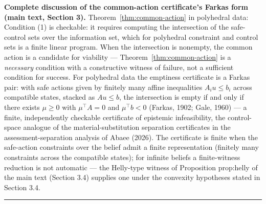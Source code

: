 \documentclass[11pt]{article}
\theoremstyle{definition}
\begin{document}
\bigskip
\noindent\textbf{Complete discussion of the common-action certificate's Farkas form (main text, Section 3).}
Theorem~\ref{thm:common-action} in polyhedral data:
Condition (1) is checkable: it requires computing the intersection of
the safe-control sets over the information set, which for polyhedral
constraint and control sets is a finite linear program. When the
intersection is nonempty, the common action is a candidate for viability
--- Theorem~\ref{thm:common-action} is a \emph{necessary} condition with a constructive
witness of failure, not a sufficient condition for success. For
polyhedral data the emptiness certificate is a Farkas pair: with safe
actions given by finitely many affine inequalities \(A_i u \le b_i\)
across compatible states, stacked as \(A u \le b\), the intersection is
empty if and only if there exists \(\mu \ge 0\) with \(\mu^{\top} A = 0\) and \(\mu^{\top} b < 0\) (Farkas, 1902;
Gale, 1960) --- a finite, independently checkable certificate of
epistemic infeasibility, the control-space analogue of the material-substitution separation certificates in the assessment-separation analysis of Abaee (2026). The certificate
is finite when the safe-action constraints over the belief admit a finite
representation (finitely many constraints across the compatible states);
for infinite beliefs a finite-witness reduction is not automatic --- the Helly-type witness of Proposition prop:helly of the main text (Section 3.4) supplies one under the
convexity hypotheses stated in Section 3.4.
\rule{0.5\linewidth}{0.5pt}
\end{document}
